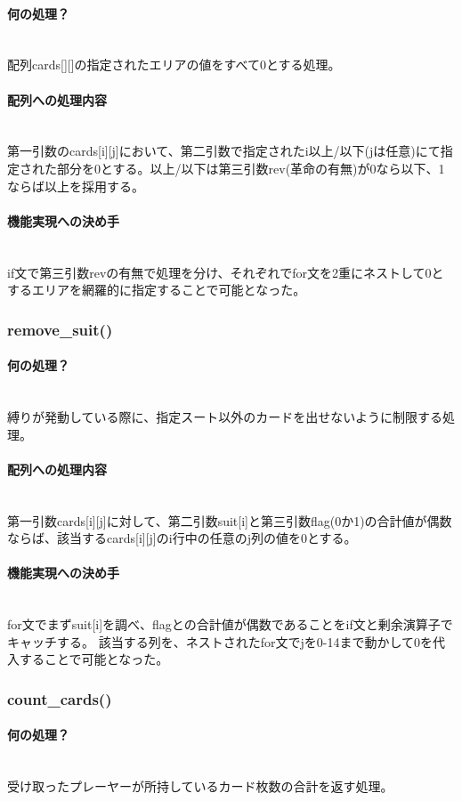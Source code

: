 \documentclass[11pt,a4paper, uplatex]{jsarticle}
\begin{document}
\paragraph{何の処理？}\mbox{}\\
配列cards[][]の指定されたエリアの値をすべて0とする処理。
\paragraph{配列への処理内容}\mbox{}\\
第一引数のcards[i][j]において、第二引数で指定されたi以上/以下(jは任意)にて指定された部分を0とする。以上/以下は第三引数rev(革命の有無)が0なら以下、1ならば以上を採用する。
\paragraph{機能実現への決め手}\mbox{}\\
if文で第三引数revの有無で処理を分け、それぞれでfor文を2重にネストして0とするエリアを網羅的に指定することで可能となった。
%
\subsubsection{remove\_suit()}
\paragraph{何の処理？}\mbox{}\\
縛りが発動している際に、指定スート以外のカードを出せないように制限する処理。
\paragraph{配列への処理内容}\mbox{}\\
第一引数cards[i][j]に対して、第二引数suit[i]と第三引数flag(0か1)の合計値が偶数ならば、該当するcards[i][j]のi行中の任意のj列の値を0とする。
\paragraph{機能実現への決め手}\mbox{}\\
for文でまずsuit[i]を調べ、flagとの合計値が偶数であることをif文と剰余演算子でキャッチする。
該当する列を、ネストされたfor文でjを0-14まで動かして0を代入することで可能となった。
%
\subsubsection{count\_cards()}
\paragraph{何の処理？}\mbox{}\\
受け取ったプレーヤーが所持しているカード枚数の合計を返す処理。
\end{document}
